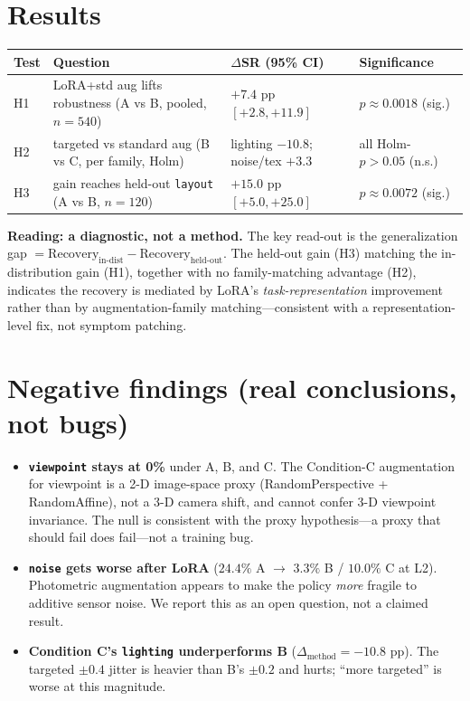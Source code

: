 \documentclass[11pt]{article}
\begin{document}
\section{Results}
\begin{center}
\begin{tabular}{l l l l}
\hline
Test & Question & $\Delta$SR (95\% CI) & Significance \\
\hline
H1 & LoRA+std aug lifts robustness (A vs B, pooled, $n{=}540$) & $+7.4$ pp $[+2.8, +11.9]$ & $p\approx0.0018$ (sig.) \\
H2 & targeted vs standard aug (B vs C, per family, Holm) & lighting $-10.8$; noise/tex $+3.3$ & all Holm-$p>0.05$ (n.s.) \\
H3 & gain reaches held-out \texttt{layout} (A vs B, $n{=}120$) & $+15.0$ pp $[+5.0, +25.0]$ & $p\approx0.0072$ (sig.) \\
\hline
\end{tabular}
\end{center}

\noindent\textbf{Reading: a diagnostic, not a method.} The key read-out is the generalization gap
$=\text{Recovery}_{\text{in-dist}}-\text{Recovery}_{\text{held-out}}$. The held-out gain (H3)
matching the in-distribution gain (H1), together with no family-matching advantage (H2), indicates
the recovery is mediated by LoRA's \emph{task-representation} improvement rather than by
augmentation-family matching---consistent with a representation-level fix, not symptom patching.

\section{Negative findings (real conclusions, not bugs)}
\begin{itemize}
  \item \textbf{\texttt{viewpoint} stays at 0\%} under A, B, and C. The Condition-C augmentation for
  viewpoint is a 2-D image-space proxy (RandomPerspective + RandomAffine), not a 3-D camera shift,
  and cannot confer 3-D viewpoint invariance. The null is consistent with the proxy hypothesis---a
  proxy that should fail does fail---not a training bug.
  \item \textbf{\texttt{noise} gets worse after LoRA} ($24.4\%$ A $\to$ $3.3\%$ B / $10.0\%$ C at
  L2). Photometric augmentation appears to make the policy \emph{more} fragile to additive sensor
  noise. We report this as an open question, not a claimed result.
  \item \textbf{Condition C's \texttt{lighting} underperforms B} ($\Delta_{\text{method}}=-10.8$
  pp). The targeted $\pm0.4$ jitter is heavier than B's $\pm0.2$ and hurts; ``more targeted'' is
  worse at this magnitude.
\end{itemize}
\end{document}
